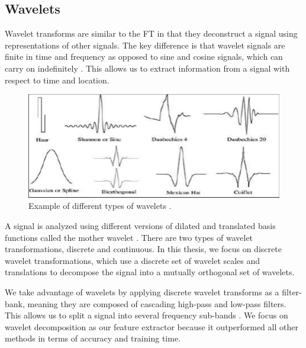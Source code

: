 \documentclass{turabian-thesis}
\begin{document}
\subsection{Wavelets}

Wavelet transforms are similar to the FT in that they deconstruct a signal using representations of other signals. The key difference is that wavelet signals are finite in time and frequency as opposed to sine and cosine signals, which can carry on indefinitely \cite{strang_wavelets_1996}. This allows us to extract information from a signal with respect to time and location.


\begin{figure}[h!]
   \begin{center}
      \includegraphics[scale=0.4]{../media/wavelet_families.png}
   \end{center}
   \caption{Example of different types of wavelets  \cite{strang_wavelets_1996}.}
   \label{fig:reinforcementAgent}
\end{figure}


A signal is analyzed using different versions of dilated and translated basis functions called the mother wavelet  \cite{strang_wavelets_1996}. There are two types of wavelet transformations, discrete and continuous. In this thesis, we focus on discrete wavelet transformations, which use a discrete set of wavelet scales and translations to decompose the signal into a mutually orthogonal set of wavelets. 

We take advantage of wavelets by applying discrete wavelet transforms as a filter-bank, meaning they are composed of cascading high-pass and low-pass filters. This allows us to split a signal into several frequency sub-bands  \cite{strang_wavelets_1996}. We focus on wavelet decomposition as our feature extractor because it outperformed all other methods in terms of accuracy and training time.


\end{document}
